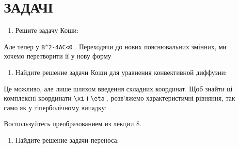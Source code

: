 \documentclass[
  ukrainian,
]{article}
\providecommand{\tightlist}{%
  \setlength{\itemsep}{0pt}\setlength{\parskip}{0pt}}
\begin{document}
\section{ЗАДАЧІ}\label{ux437ux430ux434ux430ux447ux456}

\begin{enumerate}
\def\labelenumi{\arabic{enumi}.}
\tightlist
\item
  Решите задачу Коши:
\end{enumerate}

Але тепер у \texttt{B\^{}2-4AC\textless{}0} . Переходячи до нових
пояснювальних змінних, ми хочемо перетворити її у нову форму

\begin{enumerate}
\def\labelenumi{\arabic{enumi}.}
\setcounter{enumi}{1}
\tightlist
\item
  Найдите решение задачи Коши для уравнения конвективной диффузии:
\end{enumerate}

Це можливо, але лише шляхом введення складних координат. Щоб знайти ці
комплексні координати \texttt{\textbackslash{}xi} і
\texttt{\textbackslash{}eta} , розв'яжемо характеристичні рівняння, так
само як у гіперболічному випадку:

Воспользуйтесь преобразованием из лекции 8.

\begin{enumerate}
\def\labelenumi{\arabic{enumi}.}
\setcounter{enumi}{2}
\tightlist
\item
  Найдите решение задачи переноса:
\end{enumerate}
\end{document}
